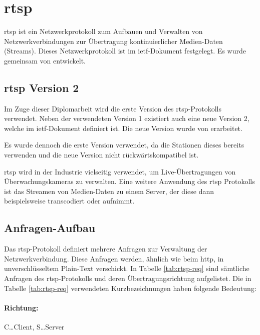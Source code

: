 \section{\acl{rtsp}}
\acs{rtsp} ist ein Netzwerkprotokoll zum Aufbauen und Verwalten von Netzwerkverbindungen zur Übertragung kontinuierlicher Medien-Daten (Streams).
Dieses Netzwerkprotokoll ist im \acs{ietf}-Dokument  festgelegt. 
Es wurde gemeinsam von \citeauthor{ietf-rtsp} entwickelt. \cite[vgl.][]{ietf-rtsp}\par

\subsection{\acs{rtsp} Version 2}
Im Zuge dieser Diplomarbeit wird die erste Version des \acs{rtsp}-Protokolls verwendet.
Neben der verwendeten Version 1 existiert auch eine neue Version 2, welche im \acs{ietf}-Dokument  definiert ist. Die neue Version wurde von \citeauthor{ietf-rtsp-2} erarbeitet. \cite[vgl.][]{ietf-rtsp-2}\par
Es wurde dennoch die erste Version verwendet, da die Stationen dieses bereits verwenden und die neue Version nicht rückwärtskompatibel ist.\par

\acs{rtsp} wird in der Industrie vielseitig verwendet, um Live-Übertragungen von Überwachungskameras zu verwalten. Eine weitere Anwendung des \acs{rtsp} Protokolls ist das Streamen von Medien-Daten zu einem Server, der diese dann beispielsweise transcodiert oder aufnimmt.

\subsection{Anfragen-Aufbau}
Das \acs{rtsp}-Protokoll definiert mehrere Anfragen zur Verwaltung der Netzwerkverbindung.
Diese Anfragen werden, ähnlich wie beim \acs{http}, in unverschlüsseltem Plain-Text verschickt.
In Tabelle \ref{tab:rtsp-req} sind sämtliche Anfragen des \acs{rtsp}-Protokolls und deren Übertragungsrichtung aufgelistet.
Die in Tabelle \ref{tab:rtsp-req} verwendeten Kurzbezeichnungen haben folgende Bedeutung:
\paragraph{Richtung:} C\dots Client, S\dots Server
